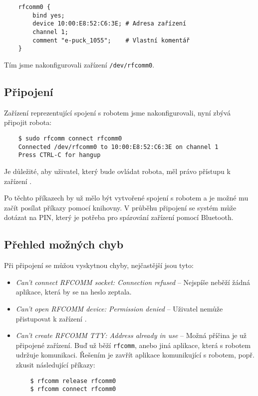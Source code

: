     \begin{verbatim}
    rfcomm0 {
        bind yes;
        device 10:00:E8:52:C6:3E; # Adresa zařízení
        channel 1;
        comment "e-puck_1055";    # Vlastní komentář
    }
    \end{verbatim}

    Tím jsme nakonfigurovali zařízení {\tt /dev/rfcomm0}.

    \subsection{Připojení}

    Zařízení reprezentující spojení s robotem jsme nakonfigurovali, nyní zbývá
    připojit robota:

    \begin{verbatim}
    $ sudo rfcomm connect rfcomm0
    Connected /dev/rfcomm0 to 10:00:E8:52:C6:3E on channel 1
    Press CTRL-C for hangup
    \end{verbatim}

    Je důležité, aby uživatel, který bude ovládat robota, měl právo přístupu k
    zařízení .

    Po těchto příkazech by už mělo být vytvořené spojení s robotem a je možné
    mu začít posílat příkazy pomocí knihovny. V průběhu připojení se systém
    může dotázat na PIN, který je potřeba pro spárování zařízení pomocí
    Bluetooth.

    \subsection{Přehled možných chyb}
    Při připojení se můžou vyskytnou chyby, nejčastější jsou tyto:
    \begin{itemize}
    \item{{\em Can't connect RFCOMM socket: Connection refused} -- Nejspíše
        neběží žádná aplikace, která by se na heslo zeptala.}
    \item{{\em Can't open RFCOMM device: Permission denied} -- Uživatel nemůže
        přistupovat k zařízení .}
    \item{{\em Can't create RFCOMM TTY: Address already in use} -- Možná
        příčina je už připojené zařízení. Buď už běží {\tt rfcomm}, anebo jiná
        aplikace, která s robotem udržuje komunikaci. Řešením je zavřít
        aplikace komunikující s robotem, popř. zkusit následující příkazy:
    \begin{verbatim}
    $ rfcomm release rfcomm0
    $ rfcomm connect rfcomm0
    \end{verbatim}
    }
    \end{itemize}

